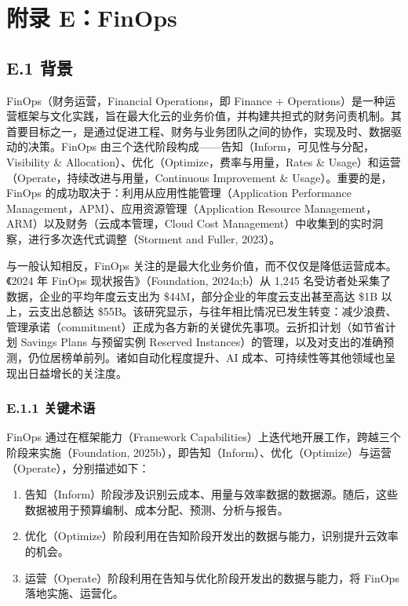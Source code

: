 \documentclass[10pt,UTF8,fontset=fandol]{ctexart}
\begin{document}
\section{附录 E：FinOps}

\subsection{E.1 背景}

FinOps（财务运营，Financial Operations，即 Finance + Operations）是一种运营框架与文化实践，旨在最大化云的业务价值，并构建共担式的财务问责机制。其首要目标之一，是通过促进工程、财务与业务团队之间的协作，实现及时、数据驱动的决策。FinOps 由三个迭代阶段构成——告知（Inform，可见性与分配，Visibility \& Allocation）、优化（Optimize，费率与用量，Rates \& Usage）和运营（Operate，持续改进与用量，Continuous Improvement \& Usage）。重要的是，FinOps 的成功取决于：利用从应用性能管理（Application Performance Management，APM）、应用资源管理（Application Resource Management，ARM）以及财务（云成本管理，Cloud Cost Management）中收集到的实时洞察，进行多次迭代式调整（Storment and Fuller, 2023）。

与一般认知相反，FinOps 关注的是最大化业务价值，而不仅仅是降低运营成本。《2024 年 FinOps 现状报告》（Foundation, 2024a;b）从 1,245 名受访者处采集了数据，企业的平均年度云支出为 \$44M，部分企业的年度云支出甚至高达 \$1B 以上，云支出总额达 \$55B。该研究显示，与往年相比情况已发生转变：减少浪费、管理承诺（commitment）正成为各方新的关键优先事项。云折扣计划（如节省计划 Savings Plans 与预留实例 Reserved Instances）的管理，以及对支出的准确预测，仍位居榜单前列。诸如自动化程度提升、AI 成本、可持续性等其他领域也呈现出日益增长的关注度。

\subsubsection*{E.1.1 关键术语}

FinOps 通过在框架能力（Framework Capabilities）上迭代地开展工作，跨越三个阶段来实施（Foundation, 2025b），即告知（Inform）、优化（Optimize）与运营（Operate），分别描述如下：

\begin{enumerate}
\item 告知（Inform）阶段涉及识别云成本、用量与效率数据的数据源。随后，这些数据被用于预算编制、成本分配、预测、分析与报告。
\item 优化（Optimize）阶段利用在告知阶段开发出的数据与能力，识别提升云效率的机会。
\item 运营（Operate）阶段利用在告知与优化阶段开发出的数据与能力，将 FinOps 落地实施、运营化。
\end{enumerate}
\end{document}
